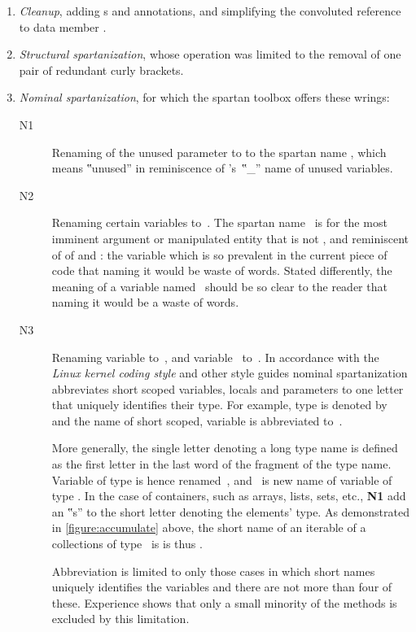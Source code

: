 \begin{enumerate}
  \item \emph{Cleanup}, adding s and  annotations,
      and simplifying the convoluted reference to data member .
    \item \emph{Structural spartanization}, whose operation was limited to the
      removal of one pair of redundant curly brackets.
    \item \emph{Nominal spartanization}, for which the spartan toolbox offers these
      wrings:
      \begin{description}
        \item[N1] Renaming of the unused
      parameter  to  to the spartan name
      \cc{\_\_}, which means ‟unused” in reminiscence of \Prolog's~‟\cc\_”
      name of unused variables.
    \item[N2] Renaming certain variables to~. The
      spartan name~ is for the most imminent argument or manipulated
      entity that is not , and reminiscent of  of \ML and
        \HyperTalk:
        the variable which is so prevalent in the current piece of code that
        naming it would be waste of words. Stated differently, the
        meaning of a variable named~ should be so clear to the reader that
        naming it would be a waste of words.

      \item[N3] Renaming variable  to~, and variable~
        to~. In accordance with the \emph{Linux kernel coding style}%
        and other style guides nominal spartanization abbreviates short scoped
        variables, locals and parameters to one letter that uniquely identifies
        their type. For example, type  is denoted by~ and the
        name of short scoped, variable  is abbreviated to~.

        More generally, the single letter denoting a long type name is defined
        as the first letter in the last word of the fragment of the type name.
        Variable  of type  is hence renamed~,
        and~ is new name of variable  of type
        . In the case of containers, such as arrays,
        lists, sets, etc., \textbf{N1} add an ‟s” to the short letter
        denoting the elements' type. As demonstrated in
        \cref{figure:accumulate} above, the short name of an iterable of a
        collections of type~ is is thus .

        Abbreviation is limited to only those cases in which short names
        uniquely identifies the variables and there are not more than four of
        these. Experience shows that only a small minority of the methods is
        excluded by this limitation.
\end{description}
  \end{enumerate}

